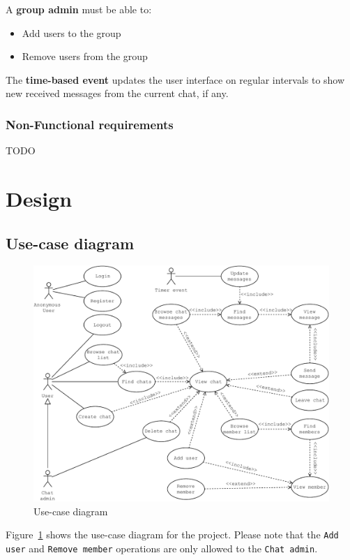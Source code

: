 \documentclass[10pt]{article}
\begin{document}
A \textbf{group admin} must be able to:
\begin{itemize}
    \item Add users to the group
    \item Remove users from the group
\end{itemize}

The \textbf{time-based event} updates the user interface on regular intervals
to show new received messages from the current chat, if any.

\subsubsection{Non-Functional requirements}
TODO

\clearpage
\section{Design}
\subsection{Use-case diagram}
\begin{figure}[h!]
    \centering
    \includegraphics[width=\textwidth]{figs/use_case_diagram}
    \caption{Use-case diagram}
    \label{fig:usecase}
\end{figure}
Figure~\ref{fig:usecase} shows the use-case diagram for the project. Please note 
that the \texttt{Add user} and \texttt{Remove member} 
operations are only allowed to the \texttt{Chat admin}.
\end{document}
